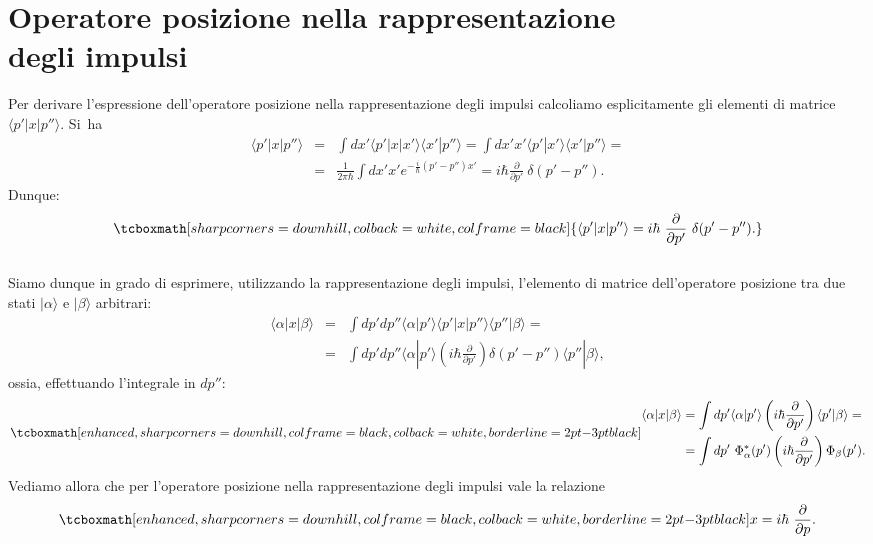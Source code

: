 \documentclass[a4paper,12pt,oneside]{book}
\begin{document}
\section[Operatore posizione nella rappresentazione degli impulsi]{Operatore posizione nella rappresentazione\\degli impulsi}
Per derivare l'espressione dell'operatore posizione nella rappresentazione degli impulsi calcoliamo esplicitamente gli elementi di matrice $\langle p' | x | p'' \rangle$. Si~ha
	\begin{eqnarray}
		\langle p' | x | p'' \rangle &=& \int dx' \langle p' | x | x' \rangle \langle x' | p'' \rangle =  \int dx' x' \langle p' | x' \rangle \langle x' | p'' \rangle = \nonumber\\
		&=& \frac{1}{2 \pi \hbar} \int dx' x' e^{-\frac{i}{\hbar} (p'-p'') x'} =   i \hbar \frac{\partial}{\partial p'} ~\delta(p' - p'').
	\end{eqnarray}
Dunque:
	\begin{equation}
		\tcboxmath[sharp corners=downhill, colback=white, colframe=black]{		
			\langle p' | x | p'' \rangle = i \hbar~ \frac{\partial}{\partial p'} ~\delta(p' - p'').
			}
	\end{equation}\\
	
Siamo dunque in grado di esprimere, utilizzando la rappresentazione degli impulsi, l'elemento di matrice dell'operatore posizione tra due stati $| \alpha \rangle$ e $| \beta \rangle$ arbitrari:
	\begin{eqnarray}
		\langle \alpha | x | \beta \rangle &=& \int dp' dp'' \langle \alpha | p' \rangle \langle p' | x | p'' \rangle \langle p'' | \beta \rangle = \nonumber \\
		&=& \int dp' dp'' \langle \alpha | p' \rangle \left(i \hbar \frac{\partial}{\partial p'} \right) \delta(p'-p'') \langle p'' | \beta \rangle,
	\end{eqnarray}
ossia, effettuando l'integrale in $dp''$:
	\begin{equation}
		\tcboxmath[enhanced, sharp corners=downhill, colframe=black, colback=white, borderline={2pt}{-3pt}{black}]{
		\begin{aligned}
			\langle \alpha | x | \beta \rangle &= \int dp' \langle \alpha | p' \rangle \left(i \hbar \frac{\partial}{\partial p'} \right) \langle p' | \beta \rangle = \\
			&= \int dp'~ \Phi ^* _\alpha(p') \left(i \hbar \frac{\partial}{\partial p'} \right) \Phi_\beta(p').
		\end{aligned}
		}
	\end{equation}
Vediamo allora che per l'operatore posizione nella rappresentazione degli impulsi vale la relazione
	\begin{equation}
		\tcboxmath[enhanced, sharp corners=downhill, colframe=black, colback=white, borderline={2pt}{-3pt}{black}]{
			x = i \hbar~ \frac{\partial}{\partial p} .
			}
	\end{equation}
\end{document}
